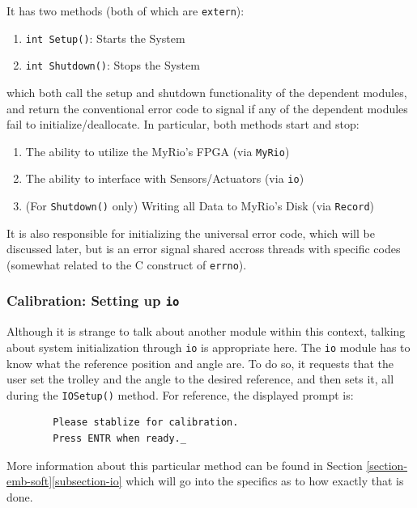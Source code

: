 \documentclass[letterpaper]{article}
\begin{document}
It has two methods (both of which are \texttt{extern}):
\begin{enumerate}
    \item \texttt{int Setup()}: Starts the System
    \item \texttt{int Shutdown()}: Stops the System
\end{enumerate}
which both call the setup and shutdown functionality of the dependent modules, and return the conventional error code to signal if any of the dependent modules fail to initialize/deallocate. In particular, both methods start and stop:
\begin{enumerate}
    \item The ability to utilize the MyRio's FPGA (via \texttt{MyRio})
    \item The ability to interface with Sensors/Actuators (via \texttt{io})
    \item (For \texttt{Shutdown()} only) Writing all Data to MyRio's Disk (via \texttt{Record})
\end{enumerate}

It is also responsible for initializing the universal error code, which will be discussed later, but is an error signal shared accross threads with specific codes (somewhat related to the C construct of \texttt{errno}).

\subsubsection{Calibration: Setting up \texttt{io}}
Although it is strange to talk about another module within this context, talking about system initialization through \texttt{io} is appropriate here. The \texttt{io} module has to know what the reference position and angle are. To do so, it requests that the user set the trolley and the angle to the desired reference, and then sets it, all during the \texttt{IOSetup()} method. For reference, the displayed prompt is:

\begin{center}
    \begin{lstlisting}
        Please stablize for calibration.
        Press ENTR when ready._
    \end{lstlisting}
\end{center}

More information about this particular method can be found in Section \ref{section-emb-soft}\ref{subsection-io} which will go into the specifics as to how exactly that is done.
\end{document}
